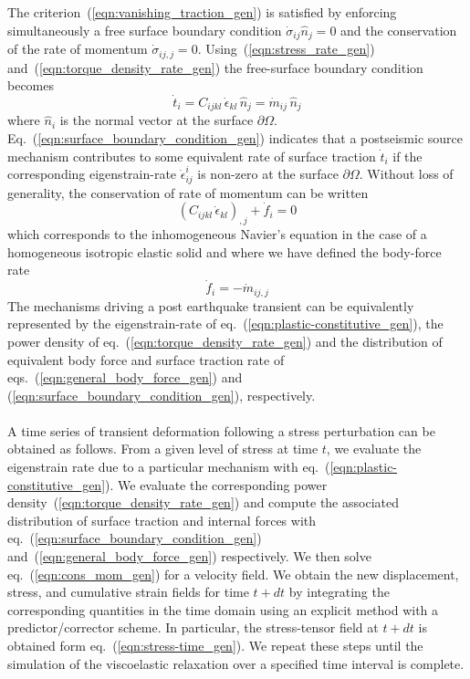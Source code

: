\documentclass[letterpaper,12pt,]{memoir}
\begin{document}
The criterion~(\ref{eqn:vanishing_traction_gen}) is satisfied by enforcing simultaneously a free surface boundary condition $\dot{\sigma}_{ij}\hat{n}_{j}=0$ and the conservation of the rate of momentum $\dot{\sigma}_{ij,j}=0$. Using~(\ref{eqn:stress_rate_gen}) and~(\ref{eqn:torque_density_rate_gen}) the free-surface boundary condition becomes
\begin{equation}\label{eqn:surface_boundary_condition_gen}
\dot{t}_i=C_{ijkl}\,\dot{\epsilon}_{kl}\,\hat{n}_j=\dot{m}_{ij}\,\hat{n}_j
\end{equation}
where $\hat{n}_i$ is the normal vector at the surface $\partial\Omega$. Eq.~(\ref{eqn:surface_boundary_condition_gen}) indicates that a postseismic source mechanism contributes to some equivalent rate of surface traction $\dot{t}_i$ if the corresponding eigenstrain-rate $\dot{\epsilon}_{ij}^i$ is non-zero at the surface $\partial\Omega$. Without loss of generality, the conservation of rate of momentum can be written
\begin{equation}\label{eqn:cons_mom_gen}
\left(C_{ijkl}\,\dot{\epsilon}_{kl}\right)_{,j}+\dot{f}_i=0
\end{equation}
which corresponds to the inhomogeneous Navier's equation in the case of a homogeneous isotropic elastic solid and where we have defined the body-force rate
\begin{equation}\label{eqn:general_body_force_gen}
\dot{f}_i=-\dot{m}_{ij,j}
\end{equation}
The mechanisms driving a post earthquake transient can be equivalently represented by the eigenstrain-rate of eq.~(\ref{eqn:plastic-constitutive_gen}), the power density of eq.~(\ref{eqn:torque_density_rate_gen}) and the distribution of equivalent body force and surface traction rate of eqs.~(\ref{eqn:general_body_force_gen}) and (\ref{eqn:surface_boundary_condition_gen}), respectively. \\
\\
A time series of transient deformation following a stress perturbation can be obtained as follows. From a given level of stress at time $t$, we evaluate the eigenstrain rate due to a particular mechanism with eq.~(\ref{eqn:plastic-constitutive_gen}). We evaluate the corresponding power density~(\ref{eqn:torque_density_rate_gen}) and compute the associated distribution of surface traction and internal forces with eq.~(\ref{eqn:surface_boundary_condition_gen}) and~(\ref{eqn:general_body_force_gen}) respectively. We then solve eq.~(\ref{eqn:cons_mom_gen}) for a velocity field. We obtain the new displacement, stress, and cumulative strain fields for time $t+dt$ by integrating the corresponding quantities in the time domain using an explicit method with a predictor/corrector scheme. In particular, the stress-tensor field at $t+dt$ is obtained form eq.~(\ref{eqn:stress-time_gen}). We repeat these steps until the simulation of the viscoelastic relaxation over a specified time interval is complete. \\
\end{document}
